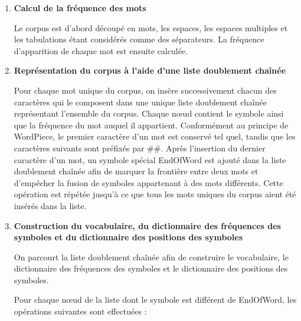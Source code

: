 \documentclass[12pt,a4paper]{report}
\begin{document}
	\begin{enumerate}
		\item \textbf{Calcul de la fréquence des mots}
		
		Le corpus est d'abord découpé en mots, les espaces, les espaces multiples et les tabulations étant considérés comme des séparateurs. La fréquence d'apparition de chaque mot est ensuite calculée.
		
		\item \textbf{Représentation du corpus à l'aide d'une liste doublement chaînée}
		
		Pour chaque mot unique du corpus, on insère successivement chacun des caractères qui le composent dans une unique liste doublement chaînée représentant l'ensemble du corpus. Chaque nœud contient le symbole ainsi que la fréquence du mot auquel il appartient. Conformément au principe de WordPiece, le premier caractère d'un mot est conservé tel quel, tandis que les caractères suivants sont préfixés par \#\#. Après l'insertion du dernier caractère d'un mot, un symbole spécial EndOfWord est ajouté dans la liste doublement chaînée afin de marquer la frontière entre deux mots et d'empêcher la fusion de symboles appartenant à des mots différents. Cette opération est répétée jusqu'à ce que tous les mots uniques du corpus aient été insérés dans la liste.
		
		\item \textbf{Construction du vocabulaire, du dictionnaire des fréquences des symboles et du dictionnaire des positions des symboles}
		
		On parcourt la liste doublement chaînée afin de construire le vocabulaire, le dictionnaire des fréquences des symboles et le dictionnaire des positions des symboles.
		
		Pour chaque nœud de la liste dont le symbole est différent de EndOfWord, les opérations suivantes sont effectuées :
		
\end{enumerate}
\end{document}
